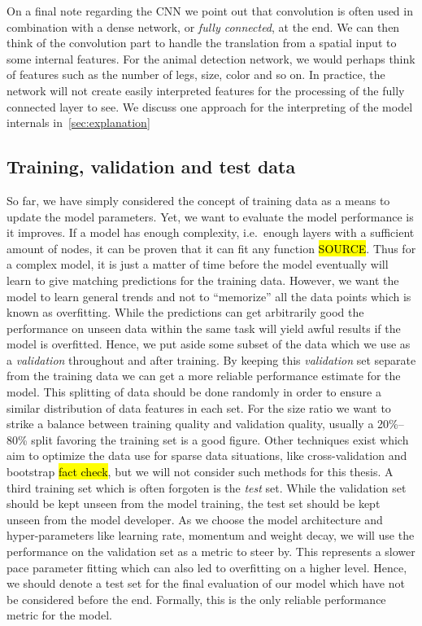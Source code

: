 On a final note regarding the \acrshort{CNN} we point out that convolution is often used in combination with a dense network, or \textit{fully connected}, at the end. We can then think of the convolution part to handle the translation from a spatial input to some internal features. For the animal detection network, we would perhaps think of features such as the number of legs, size, color and so on. In practice, the network will not create easily interpreted features for the processing of the fully connected layer to see. We discuss one approach for the interpreting of the model internals in~\cref{sec:explanation}

%
%
%
%

\subsection{Training, validation and test data}
So far, we have simply considered the concept of training data as a means to
update the model parameters. Yet, we want to evaluate the model performance is
it improves. If a model has enough complexity, i.e.\ enough layers with a
sufficient amount of nodes, it can be proven that it can fit any function
\hl{SOURCE}. Thus for a complex model, it is just a matter of time before the
model eventually will learn to give matching predictions for the training data.
However, we want the model to learn general trends and not to ``memorize'' all
the data points which is known as overfitting. While the predictions can get
arbitrarily good the performance on unseen data within the same task will yield
awful results if the model is overfitted. Hence, we put aside some subset of the
data which we use as a \textit{validation} throughout and after training. By
keeping this \textit{validation} set separate from the training data we can get
a more reliable performance estimate for the model. This splitting of data
should be done randomly in order to ensure a similar distribution of data
features in each set. For the size ratio we want to strike a balance between
training quality and validation quality, usually a 20\%--80\% split favoring the
training set is a good figure. Other techniques exist which aim to optimize the
data use for sparse data situations, like cross-validation and bootstrap
\hl{fact check}, but we will not consider such methods for this thesis. A third
training set which is often forgoten is the \textit{test} set. While the
validation set should be kept unseen from the model training, the test set
should be kept unseen from the model developer. As we choose the model
architecture and hyper-parameters like learning rate, momentum and weight decay,
we will use the performance on the validation set as a metric to steer by. This
represents a slower pace parameter fitting which can also led to overfitting on
a higher level. Hence, we should denote a test set for the final evaluation of
our model which have not be considered before the end. Formally, this is the
only reliable performance metric for the model. 



